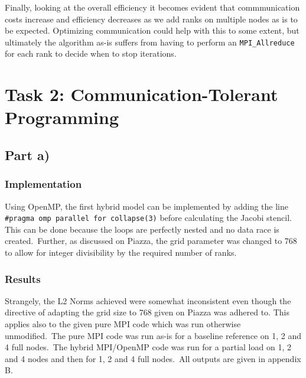 \documentclass[11pt,a4paper]{article}
\begin{document}
Finally, looking at the overall efficiency it becomes evident that commmunication costs
increase and efficiency decreases as we add ranks on multiple nodes as is to be expected. Optimizing communication could
help with this to some extent, but ultimately the algorithm as-is suffers from having to 
perform an \texttt{MPI\_Allreduce} for each rank to decide when to stop iterations.



\section{Task 2: Communication-Tolerant Programming}



\subsection{Part a)}
\subsubsection{Implementation}
Using OpenMP, the first hybrid model can be implemented by adding the line
\texttt{\#pragma omp parallel for collapse(3)} before calculating the Jacobi stencil.
This can be done because the loops are perfectly nested and no data race is created.\
Further, as discussed on Piazza, the grid parameter was changed to 768 to allow for
integer divisibility by the required number of ranks.

\subsubsection{Results}
Strangely, the L2 Norms achieved were somewhat inconsistent even though the directive
of adapting the grid size to 768 given on Piazza was adhered to. This applies also
to the given pure MPI code which was run otherwise unmodified.\
The pure MPI code was run as-is for a baseline reference on 1, 2 and 4 full nodes.\
The hybrid MPI/OpenMP code was run for a partial load on 1, 2 and 4 nodes
 and then for 1, 2 and 4 full nodes.\
All outputs are given in appendix B.
\end{document}
